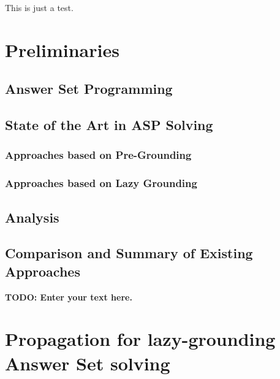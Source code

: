 \documentclass{vutinfth} %
\newcommand{\todo}[1]{{\color{red}\textbf{TODO: {#1}}}} %
\begin{document}
This is just a test.\cite{Gebser:2012:CAS:2228640.2228952}

\chapter{Preliminaries}

\section{Answer Set Programming}


\section{State of the Art in ASP Solving}

\subsection{Approaches based on Pre-Grounding}



\subsection{Approaches based on Lazy Grounding}

\section{Analysis}

\section{Comparison and Summary of Existing Approaches}

\todo{Enter your text here.}

\chapter{Propagation for lazy-grounding Answer Set solving}
\end{document}
